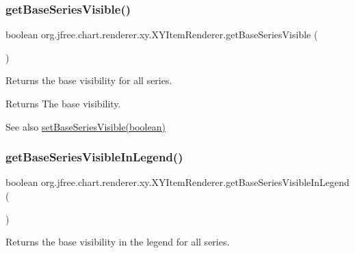 \subsubsection{\texorpdfstring{get\+Base\+Series\+Visible()}{getBaseSeriesVisible()}}
{\footnotesize\ttfamily boolean org.\+jfree.\+chart.\+renderer.\+xy.\+X\+Y\+Item\+Renderer.\+get\+Base\+Series\+Visible (\begin{DoxyParamCaption}{ }\end{DoxyParamCaption})}

Returns the base visibility for all series.

\begin{DoxyReturn}{Returns}
The base visibility.
\end{DoxyReturn}
\begin{DoxySeeAlso}{See also}
\mbox{\hyperlink{interfaceorg_1_1jfree_1_1chart_1_1renderer_1_1xy_1_1_x_y_item_renderer_a223f697346a47561ead7d43ebdb9fb84}{set\+Base\+Series\+Visible(boolean)}} 
\end{DoxySeeAlso}
\mbox{\label{interfaceorg_1_1jfree_1_1chart_1_1renderer_1_1xy_1_1_x_y_item_renderer_ac39942d497bba9355b4b1e597028ce1a}} 
\subsubsection{\texorpdfstring{get\+Base\+Series\+Visible\+In\+Legend()}{getBaseSeriesVisibleInLegend()}}
{\footnotesize\ttfamily boolean org.\+jfree.\+chart.\+renderer.\+xy.\+X\+Y\+Item\+Renderer.\+get\+Base\+Series\+Visible\+In\+Legend (\begin{DoxyParamCaption}{ }\end{DoxyParamCaption})}

Returns the base visibility in the legend for all series.

